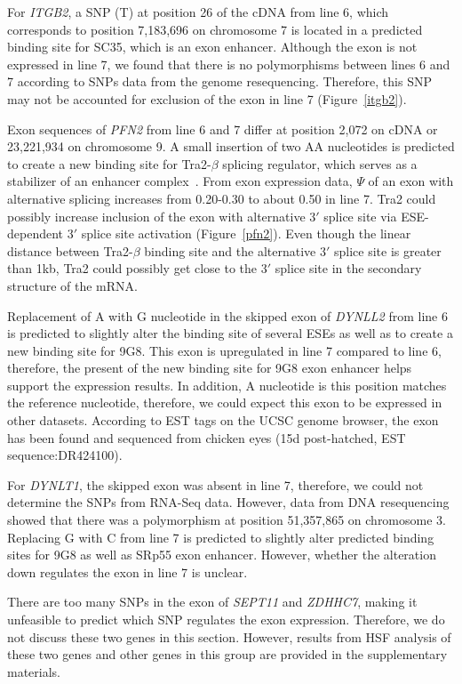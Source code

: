 \documentclass[10pt]{article}
\begin{document}
For {\em ITGB2}, a SNP (T) at position 26 of the cDNA from line 6, which
corresponds to position 7,183,696 on chromosome 7 is located in a predicted
binding site for SC35, which is an exon enhancer.  Although the exon is not
expressed in line 7, we found that there is no polymorphisms between lines 6 and
7 according to SNPs data from the genome resequencing.  Therefore, this SNP may
not be accounted for exclusion of the exon in line 7 (Figure~\ref{itgb2}).

Exon sequences of {\em PFN2} from line 6 and 7 differ at position 2,072 on cDNA
or 23,221,934 on chromosome 9.  A small insertion of two AA nucleotides is
predicted to create a new binding site for Tra2-$\beta$ splicing regulator,
which serves as a stabilizer of an enhancer complex~\cite{lopez1998alternative}.
From exon expression data, $\Psi$ of an exon with alternative splicing increases
from 0.20-0.30 to about 0.50 in line 7.  Tra2 could possibly increase inclusion
of the exon with alternative 3$\prime$ splice site via ESE-dependent 3$\prime$
splice site activation (Figure~\ref{pfn2}).  Even though the linear distance
between Tra2-$\beta$ binding site and the alternative 3$\prime$ splice site is
greater than 1kb, Tra2 could possibly get close to the 3$\prime$ splice site in
the secondary structure of the mRNA.

Replacement of A with G nucleotide in the skipped exon of {\em DYNLL2} from line
6 is predicted to slightly alter the binding site of several ESEs as well as to
create a new binding site for 9G8.  This exon is upregulated in line 7 compared
to line 6, therefore, the present of the new binding site for 9G8 exon enhancer
helps support the expression results.  In addition, A nucleotide is this
position matches the reference nucleotide, therefore, we could expect this exon
to be expressed in other datasets.  According to EST tags on the UCSC genome
browser, the exon has been found and sequenced from chicken eyes (15d
post-hatched, EST sequence:DR424100).

For {\em DYNLT1}, the skipped exon was absent in line 7, therefore, we could not
determine the SNPs from RNA-Seq data.  However, data from DNA resequencing
showed that there was a polymorphism at position 51,357,865 on chromosome 3.
Replacing G with C from line 7 is predicted to slightly alter predicted binding
sites for 9G8 as well as SRp55 exon enhancer.  However, whether the alteration
down regulates the exon in line 7 is unclear.

There are too many SNPs in the exon of {\em SEPT11} and {\em ZDHHC7}, making it
unfeasible to predict which SNP regulates the exon expression.  Therefore, we do
not discuss these two genes in this section.  However, results from HSF analysis
of these two genes and other genes in this group are provided in the
supplementary materials.
\end{document}
